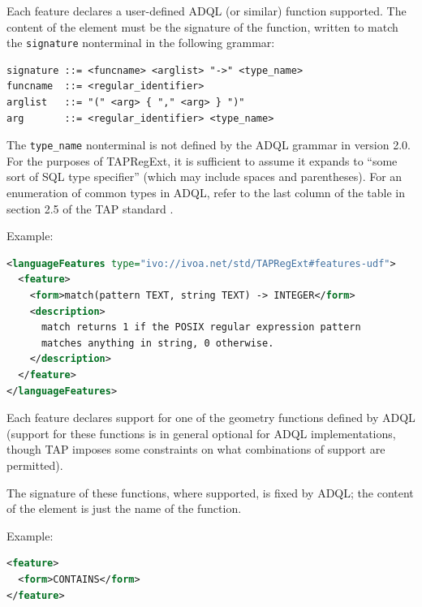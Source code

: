 \documentclass{ivoa}
\begin{document}
\begin{bigdescription}
\item[\nolinkurl{ivo://ivoa.net/std/TAPRegExt\#features-udf}] Each feature declares a user-defined ADQL (or similar) function supported.
    The content of the  element
    must be the signature of the function, written to match the
    \texttt{signature} nonterminal in the following grammar:


\begin{verbatim}
signature ::= <funcname> <arglist> "->" <type_name>
funcname  ::= <regular_identifier>
arglist   ::= "(" <arg> { "," <arg> } ")"
arg       ::= <regular_identifier> <type_name>
\end{verbatim}

The \texttt{type\_name} nonterminal is not defined by the ADQL
		grammar in version 2.0.
		For the purposes of TAPRegExt, it is sufficient to assume
		it expands to ``some sort of SQL type specifier'' (which may
		include spaces and parentheses).  For an enumeration of common types
		in ADQL, refer to the last column of the table in section 2.5 of
		the TAP standard \citep{2019ivoa.spec.0927D}.

Example:


\begin{lstlisting}[language=XML,basicstyle=\footnotesize]
<languageFeatures type="ivo://ivoa.net/std/TAPRegExt#features-udf">
  <feature>
    <form>match(pattern TEXT, string TEXT) -> INTEGER</form>
    <description>
      match returns 1 if the POSIX regular expression pattern
      matches anything in string, 0 otherwise.
    </description>
  </feature>
</languageFeatures>
\end{lstlisting}


\item[\nolinkurl{ivo://ivoa.net/std/TAPRegExt\#features-adqlgeo}] Each feature declares support for one of the geometry functions
		defined by ADQL
    (support for these functions is in general optional for ADQL
    implementations, though TAP imposes some constraints on what
    combinations of support are permitted).

The signature of these functions, where supported, is fixed by ADQL;
    the content of the  element
    is just the name of the function.

Example:


\begin{lstlisting}[language=XML,basicstyle=\footnotesize]
<feature>
  <form>CONTAINS</form>
</feature>
\end{lstlisting}



\end{bigdescription}
\end{document}
